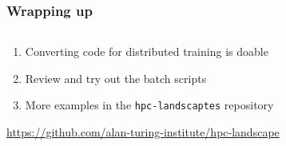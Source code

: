 \documentclass[
	notes=none,
	aspectratio=169
]{beamer}
\begin{document}

\begin{frame}
\frametitle{Wrapping up}

\begin{columns}[T]
\begin{column}[T]{1.0\textwidth}
\setlength{\parskip}{0.5em}

\vspace{0.0cm}
\begin{enumerate}
\setlength{\parskip}{0.5em}
\item Converting code for distributed training is doable
\item Review and try out the batch scripts
\item More examples in the {\tt hpc-landscaptes} repository
\end{enumerate}

\vspace{0.5cm}
\qquad \url{https://github.com/alan-turing-institute/hpc-landscape}

\end{column}
\end{columns}

\end{frame}
\note{
}


\end{document}

